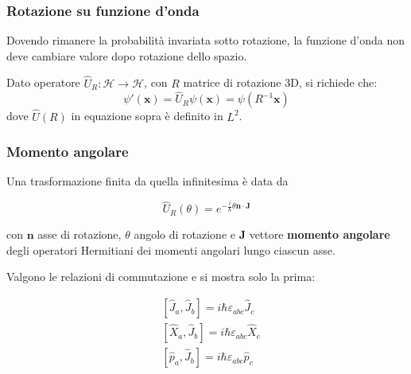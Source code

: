 \documentclass[10pt, a4paper]{scrartcl}
\numberwithin{equation}{subsection}
\theoremstyle{style2}
\theoremstyle{style1}
\newenvironment{boxenv}[1][]{
    \begin{eqbox}[#1]
    }{
   \end{eqbox}
}
\begin{document}
\subsubsection{Rotazione su funzione d'onda}

Dovendo rimanere la probabilit\`a invariata sotto rotazione, la funzione d'onda non deve cambiare valore dopo rotazione dello spazio. 

Dato operatore $\hat{U}_R:\mathcal{H}\to \mathcal{H}$, con $R$ matrice di rotazione 3D, si richiede che:
\begin{equation}
	\psi '(\mathbf{x} )= \hat{U}_R \psi (\mathbf{x} ) = \psi (R^{-1} \mathbf{x} )
\end{equation}
dove $\hat{U}(R)$ in equazione sopra \`e definito in $L^{2} $.

\subsubsection{Momento angolare}
Una trasformazione finita da quella infinitesima \`e data da
\begin{boxenv}[]
\begin{equation}
	\hat{U}_R(\theta ) = e^{-\frac{i}{\hbar }\theta \mathbf{n} \cdot \mathbf{J} } 
\end{equation}
\end{boxenv}
\noindent con $\mathbf{n} $ asse di rotazione, $\theta $ angolo di rotazione e \textbf{J} vettore \textbf{momento angolare} degli operatori Hermitiani dei momenti angolari lungo ciascun asse.

Valgono le relazioni di commutazione e si mostra solo la prima:
\begin{boxenv}[]
\begin{equation}
	\begin{split}
		&[\hat{J}_a, \hat{J}_b] = i\hbar \varepsilon _{abc} \hat{J}_c\\
		& [\hat{X}_a , \hat{J}_b] = i \hbar \varepsilon _{abc} \hat{X}_c\\
		& [\hat{p}_a , \hat{J}_b] = i \hbar \varepsilon _{abc} \hat{p}_c
	\end{split}
\end{equation}
\end{boxenv}
\end{document}
